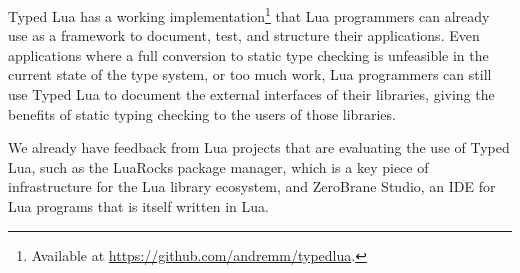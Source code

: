 \documentclass[preprint]{sigplanconf}
\begin{document}
Typed Lua has a working implementation\footnote{Available at
\url{https://github.com/andremm/typedlua}.}
that Lua programmers can already use as a framework to
document, test, and structure their applications.
Even applications where a full conversion to static
type checking is unfeasible in the current state
of the type system, or too much work,
Lua programmers can still use Typed Lua to document the
external interfaces of their libraries, giving the benefits of static typing
checking to the users of those libraries.

We already have feedback from Lua projects
that are evaluating the use of Typed Lua, such
as the LuaRocks package manager, which is a key
piece of infrastructure for the Lua library ecosystem,
and ZeroBrane Studio, an IDE for Lua programs that is itself
written in Lua.



\end{document}
